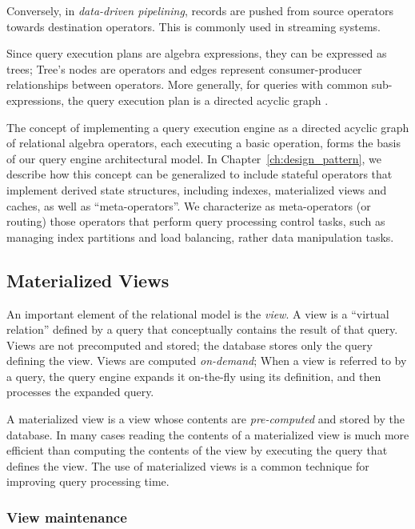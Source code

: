 Conversely, in \textit{data-driven pipelining}, records are pushed from source operators towards destination operators.
This is commonly used in streaming systems.

Since query execution plans are algebra expressions, they can be expressed as trees;
Tree's nodes are operators and edges represent consumer-producer relationships between operators.
More generally, for queries with common sub-expressions,
the query execution plan is a directed acyclic graph \cite{graefe:queryevaluation}.

The concept of implementing a query execution engine as a directed acyclic graph of relational algebra operators,
each executing a basic operation, forms the basis of our query engine architectural model.
In Chapter~\ref{ch:design_pattern}, we describe how this concept can be generalized to include
stateful operators that implement derived state structures, including indexes, materialized views and caches,
as well as  ``meta-operators''.
We characterize as meta-operators (or routing) those operators that perform query processing control tasks,
such as managing index partitions and load balancing, rather data manipulation tasks.

\subsection{Materialized Views}
\label{sec:materialize_views}
An important element of the relational model is the \textit{view}.
A view is a ``virtual relation'' defined by a query that conceptually contains the result of that query.
Views are not precomputed and stored; the database stores only the query defining the view.
Views are computed \textit{on-demand};
When a view is referred to by a query, the query engine expands it on-the-fly using its definition,
and then processes the expanded query.

A materialized view is a view whose contents are \textit{pre-computed} and stored by the database.
In many cases reading the contents of a materialized view is much more efficient than computing the contents of the view
by executing the query that defines the view.
The use of materialized views is a common technique for improving query processing time.

\subsubsection{View maintenance}

